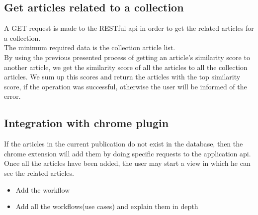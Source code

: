 \subsection{Get articles related to a collection}
\label{sec:workflow-get-articles-related-to-collection}
A GET request is made to the RESTful api in order to get the related articles for  a collection.
\\ The minimum required data is the collection article list.
\\ By using the previous presented process of getting an article’s similarity score to another article, we get the similarity score of all the articles to all the collection articles. We sum up this scores and return the articles with the top similarity score, if the operation was successful, otherwise the user will be informed of the error.

\subsection{Integration with chrome plugin}
\label{sec:workflow-integration-with-chrome-plugin}
If the articles in the current publication do not exist in the database, then the chrome extension will add them by doing specific requests to the application api.
\\ Once all the articles have been added, the user may start a view in which he can see the related articles.





\begin{itemize}
	\item Add the workflow
	\item Add all the workflows(use cases) and explain them in depth
\end{itemize}